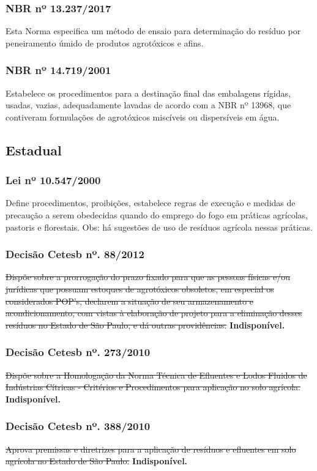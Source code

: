 \begin{subapend}
\begin{subsubapend}
		\subsubsection{NBR nº 13.237/2017} 
		Esta Norma especifica um método de ensaio para determinação do resíduo por peneiramento úmido de produtos agrotóxicos e afins. 
		\subsubsection{NBR nº 14.719/2001}
		Estabelece os procedimentos para a destinação final das embalagens rígidas, usadas, vazias, adequadamente lavadas de acordo com a NBR nº 13968, que contiveram formulações de agrotóxicos miscíveis ou dispersíveis em água.
		\subsection{Estadual}
		\subsubsection{Lei nº 10.547/2000}
		Define procedimentos, proibições, estabelece regras de execução e medidas de precaução a serem obedecidas quando do emprego do fogo em práticas agrícolas, pastoris e florestais. Obs: há sugestões de uso de resíduos agrícola nessas práticas.
		\subsubsection{Decisão Cetesb nº. 88/2012}
		\sout{Dispõe sobre a prorrogação do prazo fixado para que as pessoas físicas e/ou jurídicas que possuam estoques de agrotóxicos obsoletos, em especial os considerados POP's, declarem a situação de seu armazenamento e acondicionamento, com vistas à elaboração de projeto para a eliminação desses resíduos no Estado de São Paulo, e dá outras providências.} \textbf{Indisponível.}
		\subsubsection{Decisão Cetesb nº. 273/2010}
		\sout{Dispõe sobre a Homologação da Norma Técnica de Efluentes e Lodos Fluidos de Indústrias Cítricas - Critérios e Procedimentos para aplicação no solo agrícola.} \textbf{Indisponível.}
		\subsubsection{Decisão Cetesb nº. 388/2010}
		\sout{Aprova premissas e diretrizes para a aplicação de resíduos e efluentes em solo agrícola no Estado de São Paulo.} \textbf{Indisponível.}

\end{subsubapend}
\end{subapend}
